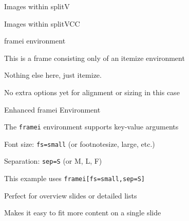 \documentclass[11pt,compress,t,notes=noshow, xcolor=table]{beamer}
\begin{document}

\begin{frame}{Images within splitV}
  
  
  \vfill
  
  
\end{frame}


\begin{frame}{Images within splitVCC}
  
  
  \vfill
  
  
\end{frame}


\begin{framei}{framei environment}
  \item This is a frame consisting only of an itemize environment
  \item Nothing else here, just itemize.
  \item No extra options yet for alignment or sizing in this case
\end{framei}


\begin{framei}[fs=small,sep=S]{Enhanced framei Environment}
  \item The \texttt{framei} environment supports key-value arguments
  \item Font size: \texttt{fs=small} (or footnotesize, large, etc.)
  \item Separation: \texttt{sep=S} (or M, L, F)
  \item This example uses \texttt{framei[fs=small,sep=S]}
  \item Perfect for overview slides or detailed lists
  \item Makes it easy to fit more content on a single slide
\end{framei}
\end{document}
